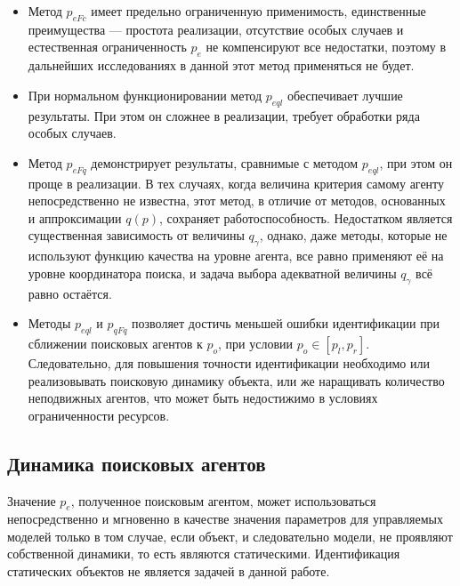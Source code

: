 \begin{itemize}

  \item
    Метод $p_{eFc}$ имеет предельно ограниченную применимость,
    единственные преимущества --- простота реализации,
    отсутствие особых случаев и естественная ограниченность
    $p_e$ не компенсируют все недостатки, поэтому в
    дальнейших исследованиях в данной этот метод применяться не будет.

  \item
    При нормальном функционировании метод $p_{eql}$
    обеспечивает лучшие результаты. При этом он сложнее
    в реализации, требует обработки ряда особых случаев.

  \item
    Метод $p_{eFq}$ демонстрирует результаты,
    сравнимые с методом $p_{eql}$, при этом
    он проще в реализации. В тех случаях,
    когда величина критерия самому агенту непосредственно не известна,
    этот метод, в отличие от методов, основанных и аппроксимации $q(p)$,
    сохраняет работоспособность. Недостатком является существенная зависимость от
    величины $q_\gamma$, однако, даже методы, которые
    не используют функцию качества на уровне агента, все равно
    применяют её на уровне координатора поиска, и задача выбора адекватной величины $q_\gamma$
    всё равно остаётся.

  \item
    Методы $p_{eql}$ и $p_{qFq}$ позволяет достичь меньшей ошибки идентификации
    при сближении поисковых агентов к $p_o$, при условии $p_o \in [p_l,p_r]$.
    Следовательно, для повышения точности идентификации необходимо
    или реализовывать поисковую динамику объекта, или же
    наращивать количество неподвижных агентов, что может быть недостижимо в условиях ограниченности
    ресурсов.


\end{itemize}





\subsection{Динамика поисковых агентов}  %

Значение $p_e$, полученное поисковым агентом, может использоваться непосредственно и
мгновенно в качестве значения параметров для управляемых моделей только в том случае,
если объект, и следовательно модели, не проявляют собственной динамики,
то есть являются статическими. Идентификация статических объектов не
является задачей в данной работе.

